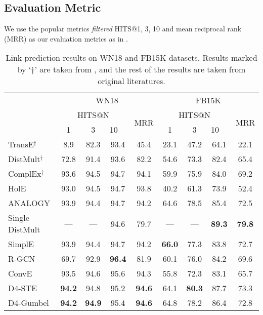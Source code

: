 \documentclass[11pt,a4paper]{article}
\begin{document}
\subsection{Evaluation Metric}
We use the popular metrics \emph{filtered} HITS@{1, 3, 10} and mean reciprocal rank (MRR) as our evaluation metrics as in \citet{transe}.

\begin{table*}[ht]
\centering
\begin{tabular}{lcccc|cccc}
\bottomrule
\multicolumn{1}{l}{\multirow{3}{*}{}} & \multicolumn{4}{c|}{WN18} & \multicolumn{4}{c}{FB15K} \\ \cline{2-9} 
\multicolumn{1}{l}{} & \multicolumn{3}{c}{HITS@N} & \multicolumn{1}{l|}{\multirow{2}{*}{MRR}} & \multicolumn{3}{c}{HITS@N} & \multirow{2}{*}{MRR} \\ \cline{2-4} \cline{6-8}
\multicolumn{1}{l}{} & 1 & 3 & \multicolumn{1}{l}{10} & \multicolumn{1}{l|}{} & 1 & 3 & \multicolumn{1}{l}{10} &  \\ 
\hline
TransE$^{\dagger}$ \cite{transe} & 8.9 & 82.3 & 93.4 & 45.4 & 23.1 & 47.2 & 64.1 & 22.1\\
\hline
DistMult$^{\dagger}$ \cite{distmult} & 72.8 & 91.4 & 93.6 & 82.2 & 54.6 & 73.3 & 82.4 & 65.4\\ 
ComplEx$^{\dagger}$ \cite{complex} & 93.6 & 94.5 & 94.7 & 94.1 & 59.9 & 75.9 & 84.0 & 69.2\\
HolE \cite{hole} & 93.0 & 94.5 & 94.7 & 93.8 & 40.2 & 61.3 & 73.9 & 52.4\\
ANALOGY \cite{analogy} & 93.9 & 94.4 & 94.7 & 94.2 & 64.6 & 78.5 & 85.4 & 72.5\\
Single DistMult \cite{kadlec} & --- & --- & 94.6 & 79.7 & --- & --- & \textbf{89.3} & \textbf{
79.8} \\
SimplE \cite{simple} & 93.9 & 94.4 & 94.7 & 94.2 & \textbf{66.0} & 77.3 & 83.8 & 72.7\\
\hline
R-GCN \cite{rgcn} & 69.7 & 92.9 & \textbf{96.4} & 81.9 & 60.1 & 76.0 & 84.2 & 69.6\\
ConvE \cite{convE} & 93.5 & 94.6 & 95.6 & 94.3 & 55.8 & 72.3 & 83.1 & 65.7\\
\hline
D4-STE & \textbf{94.2} & 94.8 & 95.2 & \textbf{94.6} & 64.1 & \textbf{80.3} & {87.7} & {73.3}\\
D4-Gumbel& \textbf{94.2} & \textbf{94.9} & 95.4 & \textbf{94.6} & 64.8 & 78.2 & 86.4 & 72.8\\


\toprule
\end{tabular}
\caption{Link prediction results on WN18 and FB15K datasets. Results marked by `$\dagger$' are taken from \cite{complex}, and the rest of the results are taken from original literatures.} \label{table: wn18_fb15k}
\end{table*}
\end{document}

